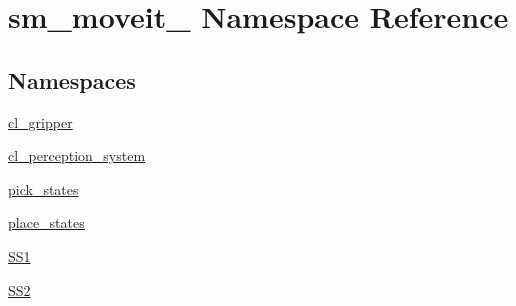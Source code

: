 \hypertarget{namespacesm__moveit__3}{}\section{sm\+\_\+moveit\+\_ Namespace Reference}
\label{namespacesm__moveit__3}
\subsection*{Namespaces}
\begin{DoxyCompactItemize}
\item 
 \hyperlink{namespacesm__moveit__3_1_1cl__gripper}{cl\+\_\+gripper}
\item 
 \hyperlink{namespacesm__moveit__3_1_1cl__perception__system}{cl\+\_\+perception\+\_\+system}
\item 
 \hyperlink{namespacesm__moveit__3_1_1pick__states}{pick\+\_\+states}
\item 
 \hyperlink{namespacesm__moveit__3_1_1place__states}{place\+\_\+states}
\item 
 \hyperlink{namespacesm__moveit__3_1_1SS1}{S\+S1}
\item 
 \hyperlink{namespacesm__moveit__3_1_1SS2}{S\+S2}
\end{DoxyCompactItemize}
